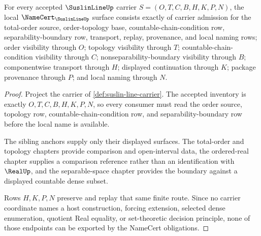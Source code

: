 \begin{theorem}
\label{thm:suslin-line-namecert-obligations}
For every accepted $\SuslinLineUp$ carrier $S=(O,T,C,B,H,K,P,N)$, the local $\NameCert_{\SuslinLineUp}$ surface consists exactly of carrier admission for the total-order source, order-topology base, countable-chain-condition row, separability-boundary row, transport, replay, provenance, and local naming rows; order visibility through $O$; topology visibility through $T$; countable-chain-condition visibility through $C$; nonseparability-boundary visibility through $B$; componentwise transport through $H$; displayed continuation through $K$; package provenance through $P$; and local naming through $N$.
\end{theorem}
\begin{proof}
Project the carrier of \autoref{def:suslin-line-carrier}. The accepted inventory is exactly $O,T,C,B,H,K,P,N$, so every consumer must read the order source, topology row, countable-chain-condition row, and separability-boundary row before the local name is available.

The sibling anchors supply only their displayed surfaces. The total-order and topology chapters provide comparison and open-interval data, the ordered-real chapter supplies a comparison reference rather than an identification with $\RealUp$, and the separable-space chapter provides the boundary against a displayed countable dense subset.

Rows $H,K,P,N$ preserve and replay that same finite route. Since no carrier coordinate names a host construction, forcing extension, selected dense enumeration, quotient Real equality, or set-theoretic decision principle, none of those endpoints can be exported by the NameCert obligations.
\end{proof}

